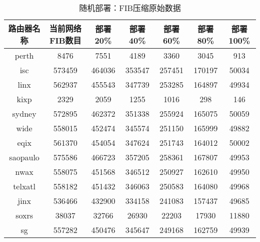 \begin{table}[h]
    \centering
    \caption{随机部署：FIB压缩原始数据}
    \label{tab:origindata}
        \begin{tabular}{|c|c|c|c|c|c|c|}
            \hline
            路由器名称 & 当前网络FIB数目 & 部署20\% &部署40\% &部署60\% &部署80\% &部署100\% \\ \hline
            perth    & 8476   & 7551   & 4189   & 3360   & 3045   & 913     \\ \hline
            isc      & 573459 & 464036 & 353547 & 257451 & 170197 & 50034    \\ \hline
            linx     & 562937 & 455543 & 347739 & 253285 & 164897 & 49934     \\ \hline
            kixp     & 2329   & 2059   & 1255   & 1016   & 298    & 146        \\ \hline
            sydney   & 572895 & 462372 & 351338 & 255924 & 165075 & 50059       \\ \hline
            wide     & 558015 & 452474 & 345574 & 251150 & 165999 & 49882        \\ \hline
            eqix     & 561370 & 454054 & 347624 & 251743 & 164012 & 50002         \\ \hline
            saopaulo & 575586 & 466723 & 357205 & 258361 & 167807 & 49953          \\ \hline
            nwax     & 558075 & 451568 & 346512 & 250927 & 162610 & 49950           \\ \hline
            telxatl  & 558182 & 451432 & 346063 & 250583 & 164080 & 49968            \\ \hline
            jinx     & 536466 & 432900 & 334158 & 241083 & 157437 & 49685             \\ \hline
            soxrs    & 38037  & 32766  & 26930  & 22203  & 17930  & 11880              \\ \hline
            sg       & 557282 & 450476 & 345647 & 249168 & 162759 & 49939               \\ \hline
        \end{tabular}
\end{table}


